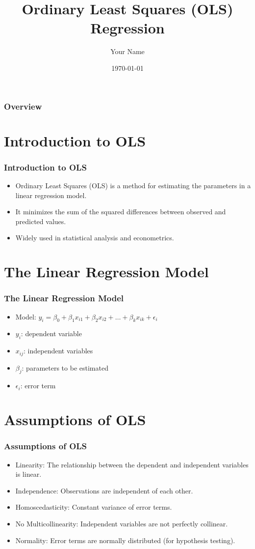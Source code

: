 \documentclass{beamer}
\title{Ordinary Least Squares (OLS) Regression}
\author{Your Name}
\date{\today}
\begin{document}
\frame{\titlepage}

\begin{frame}
    \frametitle{Overview}
    \tableofcontents
\end{frame}

\section{Introduction to OLS}
\begin{frame}
    \frametitle{Introduction to OLS}
    \begin{itemize}
        \item Ordinary Least Squares (OLS) is a method for estimating the parameters in a linear regression model.
        \item It minimizes the sum of the squared differences between observed and predicted values.
        \item Widely used in statistical analysis and econometrics.
    \end{itemize}
\end{frame}

\section{The Linear Regression Model}
\begin{frame}
    \frametitle{The Linear Regression Model}
    \begin{itemize}
        \item Model: $y_i = \beta_0 + \beta_1 x_{i1} + \beta_2 x_{i2} + \ldots + \beta_k x_{ik} + \epsilon_i$
        \item $y_i$: dependent variable
        \item $x_{ij}$: independent variables
        \item $\beta_j$: parameters to be estimated
        \item $\epsilon_i$: error term
    \end{itemize}
\end{frame}

\section{Assumptions of OLS}
\begin{frame}
    \frametitle{Assumptions of OLS}
    \begin{itemize}
        \item Linearity: The relationship between the dependent and independent variables is linear.
        \item Independence: Observations are independent of each other.
        \item Homoscedasticity: Constant variance of error terms.
        \item No Multicollinearity: Independent variables are not perfectly collinear.
        \item Normality: Error terms are normally distributed (for hypothesis testing).
    \end{itemize}
\end{frame}
\end{document}
